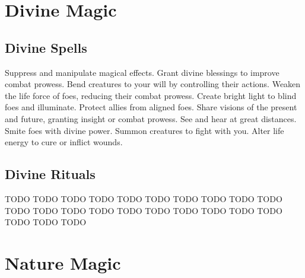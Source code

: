 \section{Divine Magic}\label{Divine Magic}
\subsection{Divine Spells}\label{Divine Spells}
\begin{spelllist}
 Suppress and manipulate magical effects.
 Grant divine blessings to improve combat prowess.
 Bend creatures to your will by controlling their actions.
 Weaken the life force of foes, reducing their combat prowess.
 Create bright light to blind foes and illuminate.
 Protect allies from aligned foes.
 Share visions of the present and future, granting insight or combat prowess.
 See and hear at great distances.
 Smite foes with divine power.
 Summon creatures to fight with you.
 Alter life energy to cure or inflict wounds.
\end{spelllist}
\subsection{Divine Rituals}\label{Divine Rituals}
\begin{spelllist}
 TODO
 TODO
 TODO
 TODO
 TODO
 TODO
 TODO
 TODO
 TODO
 TODO
 TODO
 TODO
 TODO
 TODO
 TODO
 TODO
 TODO
 TODO
 TODO
 TODO
 TODO
 TODO
 TODO
\end{spelllist}
\small
\section{Nature Magic}\label{Nature Magic}
